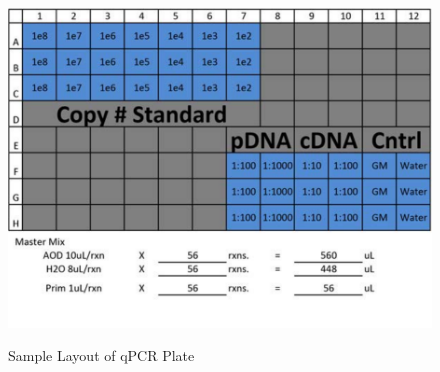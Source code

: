\documentclass[a4paper]{article}
\begin{document}
        \begin{figure}[H]
			\centering
			\includegraphics[width=1.0\textwidth]{qPCR_Template.pdf}
			\label{fig:qPCR_Template}
			\caption{Sample Layout of qPCR Plate}
		\end{figure}
        
\end{document}
